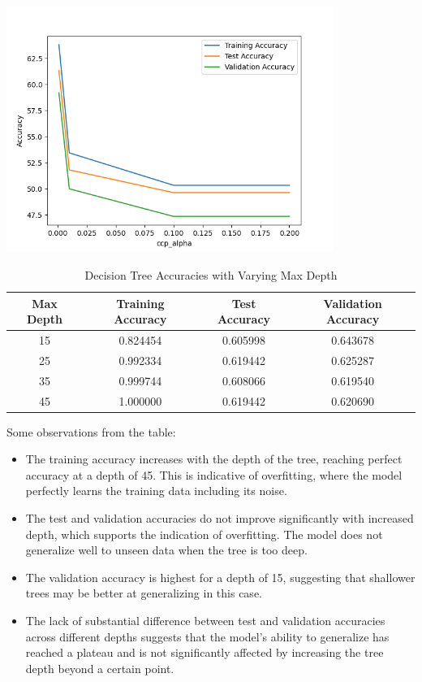 \documentclass[12pt]{article}
\begin{document}
\begin{center}
    \includegraphics[width=0.8\textwidth]{Assignment 3/q1/(d)ccp_vs_accuracy.png}
\end{center}

\begin{table}[h]
\centering
\begin{tabular}{|c|c|c|c|}
\hline
\textbf{Max Depth} & \textbf{Training Accuracy} & \textbf{Test Accuracy} & \textbf{Validation Accuracy} \\ \hline
15                 & 0.824454                   & 0.605998               & 0.643678                     \\ \hline
25                 & 0.992334                   & 0.619442               & 0.625287                     \\ \hline
35                 & 0.999744                   & 0.608066               & 0.619540                     \\ \hline
45                 & 1.000000                   & 0.619442               & 0.620690                     \\ \hline
\end{tabular}
\caption{Decision Tree Accuracies with Varying Max Depth}
\label{table:decision_tree_accuracies}
\end{table}

Some observations from the table:
\begin{itemize}
  \item The training accuracy increases with the depth of the tree, reaching perfect accuracy at a depth of 45. This is indicative of overfitting, where the model perfectly learns the training data including its noise.
  \item The test and validation accuracies do not improve significantly with increased depth, which supports the indication of overfitting. The model does not generalize well to unseen data when the tree is too deep.
  \item The validation accuracy is highest for a depth of 15, suggesting that shallower trees may be better at generalizing in this case.
  \item The lack of substantial difference between test and validation accuracies across different depths suggests that the model's ability to generalize has reached a plateau and is not significantly affected by increasing the tree depth beyond a certain point.
\end{itemize}
\end{document}
